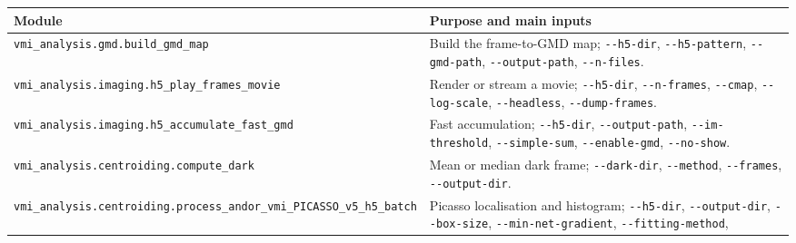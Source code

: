 \documentclass[11pt,a4paper]{article}
\newcommand{\code}[1]{\texttt{#1}}
\begin{document}
\begin{center}
\footnotesize
\begin{longtable}{@{}L{6.2cm}L{9.0cm}@{}}
\toprule
Module & Purpose and main inputs \\
\midrule
\endhead
\bottomrule
\code{vmi\_\allowbreak{}analysis.gmd.build\_\allowbreak{}gmd\_\allowbreak{}map} & Build the frame-to-GMD map;
\code{-\allowbreak{}-\allowbreak{}h5-\allowbreak{}dir}, \code{-\allowbreak{}-\allowbreak{}h5-\allowbreak{}pattern},
\code{-\allowbreak{}-\allowbreak{}gmd-\allowbreak{}path}, \code{-\allowbreak{}-\allowbreak{}output-\allowbreak{}path},
\code{-\allowbreak{}-\allowbreak{}n-\allowbreak{}files}. \\
\addlinespace
\code{vmi\_\allowbreak{}analysis.imaging.h5\_\allowbreak{}play\_\allowbreak{}frames\_\allowbreak{}movie} & Render or stream a
movie; \code{-\allowbreak{}-\allowbreak{}h5-\allowbreak{}dir}, \code{-\allowbreak{}-\allowbreak{}n-\allowbreak{}frames}, \code{-\allowbreak{}-\allowbreak{}cmap}, \code{-\allowbreak{}-\allowbreak{}log-\allowbreak{}scale},
\code{-\allowbreak{}-\allowbreak{}headless}, \code{-\allowbreak{}-\allowbreak{}dump-\allowbreak{}frames}. \\
\addlinespace
\code{vmi\_\allowbreak{}analysis.imaging.h5\_\allowbreak{}accumulate\_\allowbreak{}fast\_\allowbreak{}gmd} & Fast accumulation;
\code{-\allowbreak{}-\allowbreak{}h5-\allowbreak{}dir}, \code{-\allowbreak{}-\allowbreak{}output-\allowbreak{}path}, \code{-\allowbreak{}-\allowbreak{}im-\allowbreak{}threshold},
\code{-\allowbreak{}-\allowbreak{}simple-\allowbreak{}sum}, \code{-\allowbreak{}-\allowbreak{}enable-\allowbreak{}gmd}, \code{-\allowbreak{}-\allowbreak{}no-\allowbreak{}show}. \\
\addlinespace
\code{vmi\_\allowbreak{}analysis.centroiding.compute\_\allowbreak{}dark} & Mean or median dark frame;
\code{-\allowbreak{}-\allowbreak{}dark-\allowbreak{}dir}, \code{-\allowbreak{}-\allowbreak{}method}, \code{-\allowbreak{}-\allowbreak{}frames}, \code{-\allowbreak{}-\allowbreak{}output-\allowbreak{}dir}. \\
\addlinespace
\code{vmi\_\allowbreak{}analysis.centroiding.process\_\allowbreak{}andor\_\allowbreak{}vmi\_\allowbreak{}PICASSO\_\allowbreak{}v5\_\allowbreak{}h5\_\allowbreak{}batch} &
Picasso localisation and histogram; \code{-\allowbreak{}-\allowbreak{}h5-\allowbreak{}dir}, \code{-\allowbreak{}-\allowbreak{}output-\allowbreak{}dir},
\code{-\allowbreak{}-\allowbreak{}box-\allowbreak{}size}, \code{-\allowbreak{}-\allowbreak{}min-\allowbreak{}net-\allowbreak{}gradient}, \code{-\allowbreak{}-\allowbreak{}fitting-\allowbreak{}method},

\end{longtable}
\end{center}
\end{document}

